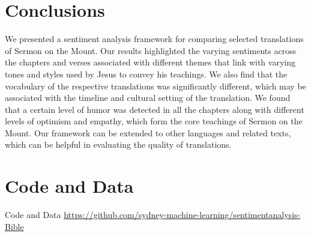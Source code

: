 \documentclass[5p,times]{elsarticle}
\begin{document}
 
 \section{Conclusions}

 We presented a sentiment analysis framework for comparing selected translations of Sermon on the Mount. Our results highlighted the varying sentiments across the chapters and verses associated with different themes that link with varying tones and styles used by Jesus to convey his teachings. We also find that the vocabulary of the respective translations was significantly different, which may be associated with the timeline and cultural setting of the translation. We found that a certain level of humor was detected in all the chapters along with different levels of optimism and empathy, which form the core teachings of Sermon on the Mount. Our framework can be extended to other languages and related texts, which can be helpful in evaluating the quality of translations.



 

\section*{Code and Data}
Code and Data \url{https://github.com/sydney-machine-learning/sentimentanalysis-Bible}

 
 
\end{document}
